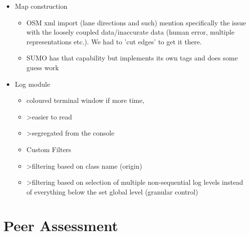 \begin{itemize}
    \item Map construction
    \begin{itemize}
        \item OSM xml import (lane directions and such)
        \itme mention specifically the issue with the loosely coupled data/inaccurate data (human error, multiple representations etc.). We had to 'cut edges' to get it there.
        \item SUMO has that capability but implements its own tags and does some guess work
    \end{itemize}

    \item Log module
    \begin{itemize}
        \item coloured terminal window if more time,
        \item >easier to read
        \item >segregated from the console
        \item Custom Filters
        \item >filtering based on class name (origin)
        \item >filtering based on selection of multiple non-sequential log levels instead of everything below the set global level (granular control)
    \end{itemize}
\end{itemize}



\section{Peer Assessment}
